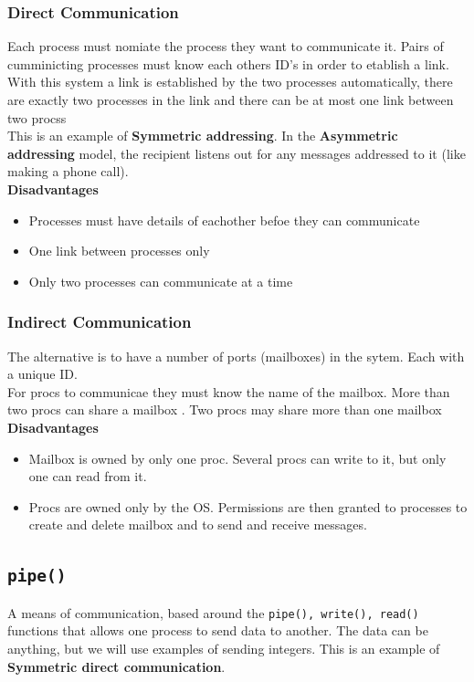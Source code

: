 \documentclass[a4paper, 10pt]{article}
\begin{document}
\subsubsection{Direct Communication}
Each process must nomiate the process they want to communicate it. Pairs of cumminicting processes must know each others ID's in order to etablish a link. With this system a link is established by the two processes automatically, there are exactly two processes in the link and there can be at most one link between two procss\\[2ex]
This is an example of \textbf{Symmetric addressing}. In the \textbf{Asymmetric addressing} model, the recipient listens out for any messages addressed to it (like making a phone call).\\[2ex]
\textbf{Disadvantages}
\begin{itemize}
    \item Processes must have details of eachother befoe they can communicate
    \item One link between processes only
    \item Only two processes can communicate at a time
\end{itemize}
\subsubsection{Indirect Communication}
The alternative is to have a number of ports (mailboxes) in the sytem. Each with a unique ID. \\[2ex]
For procs to communicae they must know the name of the mailbox. More than two procs can share a mailbox . Two procs may share more than one mailbox \\[2ex]
\textbf{Disadvantages}
\begin{itemize}
    \item Mailbox is owned by only one proc. Several procs can write to it, but only one can read from it.
    \item Procs are owned only by the OS. Permissions are then granted to processes to create and delete mailbox and to send and receive messages.
\end{itemize}
\subsection{\texttt{pipe()}}
A means of communication, based around the \texttt{pipe(), write(), read()} functions that allows one process to send data to another. The data can be anything, but we will use examples of sending integers. This is an example of \textbf{Symmetric direct communication}.
\end{document}
